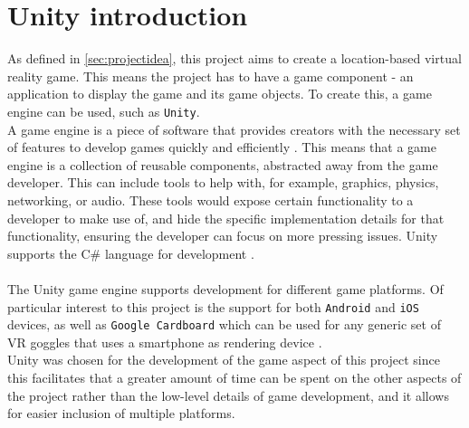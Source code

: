 \section{Unity introduction}\label{sec:unity-intro}
As defined in \autoref{sec:projectidea}, this project aims to create a location-based virtual reality game.
This means the project has to have a game component - an application to display the game and its game objects.
To create this, a game engine can be used, such as \texttt{Unity}. \\
A game engine is a piece of software that provides creators with the necessary set of features to develop games quickly and efficiently \cite{gameengine}.
This means that a game engine is a collection of reusable components, abstracted away from the game developer.
This can include tools to help with, for example, graphics, physics, networking, or audio.
These tools would expose certain functionality to a developer to make use of, and hide the specific implementation details for that functionality, ensuring the developer can focus on more pressing issues.
Unity supports the C\# language for development \cite{unitylanguage}.
\\\\
The Unity game engine supports development for different game platforms.
Of particular interest to this project is the support for both \texttt{Android} and \texttt{iOS} devices, as well as \texttt{Google Cardboard} which can be used for any generic set of VR goggles that uses a smartphone as rendering device \cite{unityplatforms}.\\
Unity was chosen for the development of the game aspect of this project since this facilitates that a greater amount of time can be spent on the other aspects of the project rather than the low-level details of game development, and it allows for easier inclusion of multiple platforms.
